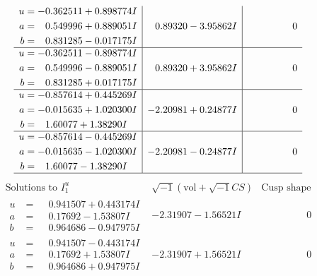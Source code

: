 \documentclass[1p]{elsarticle_modified}
\theoremstyle{definition}
\newcommand{\I}{\sqrt{-1}}
\begin{document}
$$\begin{array}{c|c|c}
\begin{aligned}
u &= -0.362511 + 0.898774 I \\
a &= \phantom{-}0.549996 + 0.889051 I \\
b &= \phantom{-}0.831285 - 0.017175 I\end{aligned}
 & \phantom{-}0.89320 - 3.95862 I & \phantom{-0.000000 } 0 \\ \hline\begin{aligned}
u &= -0.362511 - 0.898774 I \\
a &= \phantom{-}0.549996 - 0.889051 I \\
b &= \phantom{-}0.831285 + 0.017175 I\end{aligned}
 & \phantom{-}0.89320 + 3.95862 I & \phantom{-0.000000 } 0 \\ \hline\begin{aligned}
u &= -0.857614 + 0.445269 I \\
a &= -0.015635 + 1.020300 I \\
b &= \phantom{-}1.60077 + 1.38290 I\end{aligned}
 & -2.20981 + 0.24877 I & \phantom{-0.000000 } 0 \\ \hline\begin{aligned}
u &= -0.857614 - 0.445269 I \\
a &= -0.015635 - 1.020300 I \\
b &= \phantom{-}1.60077 - 1.38290 I\end{aligned}
 & -2.20981 - 0.24877 I & \phantom{-0.000000 } 0\\
 \hline 
 \end{array}$$\newpage$$\begin{array}{c|c|c}  
\text{Solutions to }I^u_{1}& \I (\text{vol} + \sqrt{-1}CS) & \text{Cusp shape}\\
 \hline 
\begin{aligned}
u &= \phantom{-}0.941507 + 0.443174 I \\
a &= \phantom{-}0.17692 - 1.53807 I \\
b &= \phantom{-}0.964686 - 0.947975 I\end{aligned}
 & -2.31907 - 1.56521 I & \phantom{-0.000000 } 0 \\ \hline\begin{aligned}
u &= \phantom{-}0.941507 - 0.443174 I \\
a &= \phantom{-}0.17692 + 1.53807 I \\
b &= \phantom{-}0.964686 + 0.947975 I\end{aligned}
 & -2.31907 + 1.56521 I & \phantom{-0.000000 } 0 \\ \hline\begin{aligned}

\end{aligned}
\end{array}$$
\end{document}
